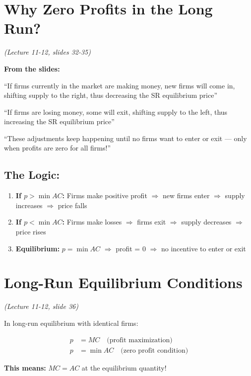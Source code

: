 \documentclass[11pt]{article}
\begin{document}
\section{Why Zero Profits in the Long Run?}
\textit{(Lecture 11-12, slides 32-35)}

\begin{tcolorbox}[colback=boxgreen, colframe=green!50!black]
\textbf{From the slides:}

``If firms currently in the market are making money, new firms will come in, shifting supply to the right, thus decreasing the SR equilibrium price''

``If firms are losing money, some will exit, shifting supply to the left, thus increasing the SR equilibrium price''

``These adjustments keep happening until no firms want to enter or exit --- only when profits are zero for all firms!''
\end{tcolorbox}

\subsection*{The Logic:}

\begin{enumerate}[leftmargin=*]
    \item \textbf{If $p > \min AC$:} Firms make positive profit $\Rightarrow$ new firms enter $\Rightarrow$ supply increases $\Rightarrow$ price falls
    \item \textbf{If $p < \min AC$:} Firms make losses $\Rightarrow$ firms exit $\Rightarrow$ supply decreases $\Rightarrow$ price rises
    \item \textbf{Equilibrium:} $p = \min AC$ $\Rightarrow$ profit = 0 $\Rightarrow$ no incentive to enter or exit
\end{enumerate}

\newpage

\section{Long-Run Equilibrium Conditions}
\textit{(Lecture 11-12, slide 36)}

In long-run equilibrium with identical firms:

\begin{tcolorbox}[colback=yellow!10, colframe=orange!75!black, title=LR Equilibrium Conditions:]
\begin{align}
p &= MC \quad \text{(profit maximization)} \\
p &= \min AC \quad \text{(zero profit condition)}
\end{align}

\textbf{This means:} $MC = AC$ at the equilibrium quantity!
\end{tcolorbox}
\end{document}
